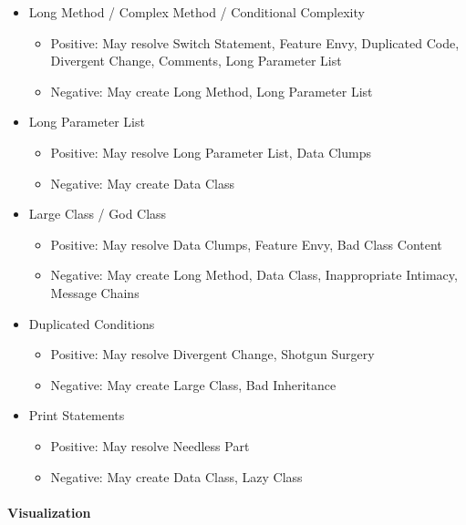 \begin{itemize}
    \item Long Method / Complex Method / Conditional Complexity
    \begin{itemize}
        \item Positive: May resolve Switch Statement, Feature Envy, Duplicated Code, Divergent Change, Comments, Long Parameter List
        \item Negative: May create Long Method, Long Parameter List
    \end{itemize}

    \item Long Parameter List
    \begin{itemize}
        \item Positive: May resolve Long Parameter List, Data Clumps
        \item Negative: May create Data Class
    \end{itemize}

    \item Large Class / God Class
    \begin{itemize}
        \item Positive: May resolve Data Clumps, Feature Envy, Bad Class Content
        \item Negative: May create Long Method, Data Class, Inappropriate Intimacy, Message Chains
    \end{itemize}

    \item Duplicated Conditions
    \begin{itemize}
        \item Positive: May resolve Divergent Change, Shotgun Surgery
        \item Negative: May create Large Class, Bad Inheritance
    \end{itemize}

    \item Print Statements
    \begin{itemize}
        \item Positive: May resolve Needless Part
        \item Negative: May create Data Class, Lazy Class
    \end{itemize}
\end{itemize}

\paragraph{Visualization}

